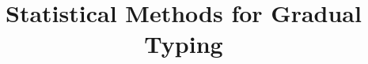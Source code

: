 \documentclass[9pt]{sigplanconf}
\title{Statistical Methods for Gradual Typing}
\newcommand{\tr}[2][]{#1}
\newenvironment{techrep}{}{}
\begin{document}
\copyrightdata{}
\doi{}
\maketitle

\begin{abstract}

\end{abstract}












\let\oldbibliography\thebibliography
\renewcommand{\thebibliography}[1]{%
  \oldbibliography{#1}%
  \tr[\setlength{\itemsep}{1.7pt}]{}%
}


%
\end{document}
